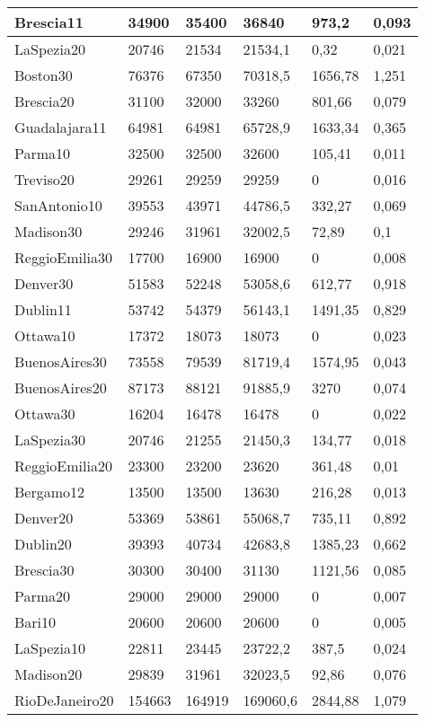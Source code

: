 \begin{longtable}[c]{|l|l|l|l|l|l|}
Brescia11 & 34900 & 35400 & 36840 & 973,2 & 0,093 \\ \hline
LaSpezia20 & 20746 & 21534 & 21534,1 & 0,32 & 0,021 \\ \hline
Boston30 & 76376 & 67350 & 70318,5 & 1656,78 & 1,251 \\ \hline
Brescia20 & 31100 & 32000 & 33260 & 801,66 & 0,079 \\ \hline
Guadalajara11 & 64981 & 64981 & 65728,9 & 1633,34 & 0,365 \\ \hline
Parma10 & 32500 & 32500 & 32600 & 105,41 & 0,011 \\ \hline
Treviso20 & 29261 & 29259 & 29259 & 0 & 0,016 \\ \hline
SanAntonio10 & 39553 & 43971 & 44786,5 & 332,27 & 0,069 \\ \hline
Madison30 & 29246 & 31961 & 32002,5 & 72,89 & 0,1 \\ \hline
ReggioEmilia30 & 17700 & 16900 & 16900 & 0 & 0,008 \\ \hline
Denver30 & 51583 & 52248 & 53058,6 & 612,77 & 0,918 \\ \hline
Dublin11 & 53742 & 54379 & 56143,1 & 1491,35 & 0,829 \\ \hline
Ottawa10 & 17372 & 18073 & 18073 & 0 & 0,023 \\ \hline
BuenosAires30 & 73558 & 79539 & 81719,4 & 1574,95 & 0,043 \\ \hline
BuenosAires20 & 87173 & 88121 & 91885,9 & 3270 & 0,074 \\ \hline
Ottawa30 & 16204 & 16478 & 16478 & 0 & 0,022 \\ \hline
LaSpezia30 & 20746 & 21255 & 21450,3 & 134,77 & 0,018 \\ \hline
ReggioEmilia20 & 23300 & 23200 & 23620 & 361,48 & 0,01 \\ \hline
Bergamo12 & 13500 & 13500 & 13630 & 216,28 & 0,013 \\ \hline
Denver20 & 53369 & 53861 & 55068,7 & 735,11 & 0,892 \\ \hline
Dublin20 & 39393 & 40734 & 42683,8 & 1385,23 & 0,662 \\ \hline
Brescia30 & 30300 & 30400 & 31130 & 1121,56 & 0,085 \\ \hline
Parma20 & 29000 & 29000 & 29000 & 0 & 0,007 \\ \hline
Bari10 & 20600 & 20600 & 20600 & 0 & 0,005 \\ \hline
LaSpezia10 & 22811 & 23445 & 23722,2 & 387,5 & 0,024 \\ \hline
Madison20 & 29839 & 31961 & 32023,5 & 92,86 & 0,076 \\ \hline
RioDeJaneiro20 & 154663 & 164919 & 169060,6 & 2844,88 & 1,079 \\ \hline
\end{longtable}